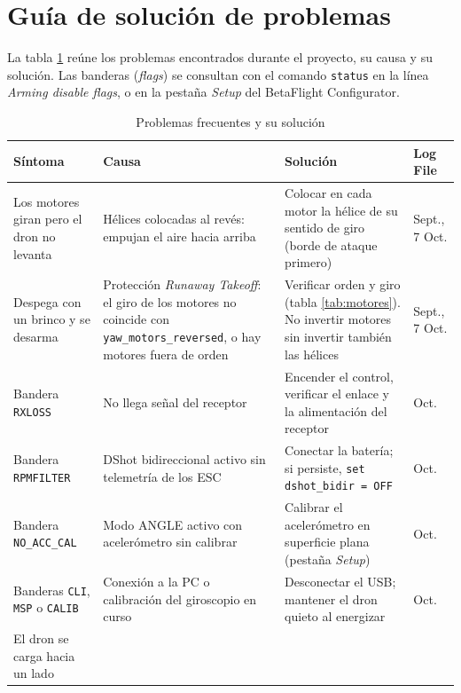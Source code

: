 \documentclass[11pt,letterpaper]{article}
\begin{document}
\section{Guía de solución de problemas}
\label{sec:problemas}
La tabla \ref{tab:problemas} reúne los problemas encontrados durante el proyecto, su causa y su solución. Las banderas (\textit{flags}) se consultan con el comando \texttt{status} en la línea \textit{Arming disable flags}, o en la pestaña \textit{Setup} del BetaFlight Configurator.

\begin{table}[!h]
\centering
\caption{Problemas frecuentes y su solución}
\label{tab:problemas}
\small
\begin{tabularx}{\textwidth}{@{}>{\raggedright\arraybackslash}p{3.2cm}>{\raggedright\arraybackslash}X>{\raggedright\arraybackslash}X>{\raggedright\arraybackslash}p{2.1cm}@{}}
\toprule
\textbf{Síntoma} & \textbf{Causa} & \textbf{Solución} & \textbf{Log File} \\
\midrule
Los motores giran pero el dron no levanta &
Hélices colocadas al revés: empujan el aire hacia arriba &
Colocar en cada motor la hélice de su sentido de giro (borde de ataque primero) &
Sept., 7 Oct. \\
\addlinespace
Despega con un brinco y se desarma &
Protección \textit{Runaway Takeoff}: el giro de los motores no coincide con \texttt{yaw\_motors\_reversed}, o hay motores fuera de orden &
Verificar orden y giro (tabla \ref{tab:motores}). No invertir motores sin invertir también las hélices &
Sept., 7 Oct. \\
\addlinespace
Bandera \texttt{RXLOSS} &
No llega señal del receptor &
Encender el control, verificar el enlace y la alimentación del receptor &
7 Oct. \\
\addlinespace
Bandera \texttt{RPMFILTER} &
DShot bidireccional activo sin telemetría de los ESC &
Conectar la batería; si persiste, \texttt{set dshot\_bidir = OFF} &
10 Oct. \\
\addlinespace
Bandera \texttt{NO\_ACC\_CAL} &
Modo ANGLE activo con acelerómetro sin calibrar &
Calibrar el acelerómetro en superficie plana (pestaña \textit{Setup}) &
13 Oct. \\
\addlinespace
Banderas \texttt{CLI}, \texttt{MSP} o \texttt{CALIB} &
Conexión a la PC o calibración del giroscopio en curso &
Desconectar el USB; mantener el dron quieto al energizar &
13 Oct. \\
\addlinespace
El dron se carga hacia un lado &

\end{tabularx}
\end{table}
\end{document}
